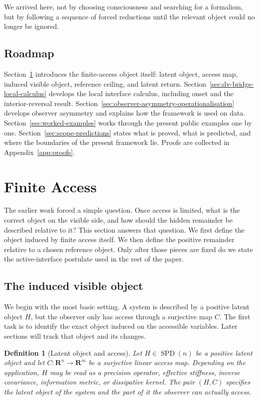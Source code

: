 \documentclass[11pt,a4paper]{article}
\numberwithin{equation}{section}
\DeclareMathOperator{\SPD}{SPD}
\newcommand{\R}{\mathbf R}
\theoremstyle{thmcompact}
\newtheorem{definition}[theorem]{Definition}
\theoremstyle{remark}
\begin{document}
We arrived here, not by choosing consciousness and searching for a formalism, but by following a sequence of forced reductions until the relevant object could no longer be ignored.

\subsection{Roadmap}

Section~\ref{sec:finite-access-object} introduces the finite-access object itself: latent object, access map, induced visible object, reference ceiling, and latent return. Section~\ref{sec:dv-bridge-local-calculus} develops the local interface calculus, including onset and the interior-reversal result. Section~\ref{sec:observer-asymmetry-operationalisation} develops observer asymmetry and explains how the framework is used on data. Section~\ref{sec:worked-examples} works through the present public examples one by one. Section~\ref{sec:scope-predictions} states what is proved, what is predicted, and where the boundaries of the present framework lie. Proofs are collected in Appendix~\ref{app:proofs}.

\section{Finite Access}
\label{sec:finite-access-object}

The earlier work forced a simple question. Once access is limited, what is the correct object on the visible side, and how should the hidden remainder be described relative to it? This section answers that question. We first define the object induced by finite access itself. We then define the positive remainder relative to a chosen reference object. Only after those pieces are fixed do we state the active-interface postulate used in the rest of the paper.

\subsection{The induced visible object}

We begin with the most basic setting. A system is described by a positive latent object \(H\), but the observer only has access through a surjective map \(C\). The first task is to identify the exact object induced on the accessible variables. Later sections will track that object and its changes.

\begin{definition}[Latent object and access]
\label{def:latent-object-access}
Let \(H\in\SPD(n)\) be a positive latent object and let \(C:\R^n\to\R^m\) be a surjective linear access map. Depending on the application, \(H\) may be read as a precision operator, effective stiffness, inverse covariance, information metric, or dissipative kernel. The pair \((H,C)\) specifies the latent object of the system and the part of it the observer can actually access.
\end{definition}
\end{document}
